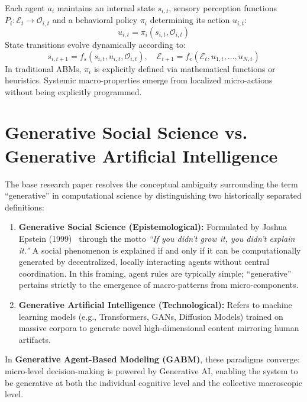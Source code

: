 \documentclass[12pt,a4paper]{report}
\begin{document}
Each agent $a_i$ maintains an internal state $s_{i,t}$, sensory perception functions $P_i: \mathcal{E}_t \to \mathcal{O}_{i,t}$ and a behavioral policy $\pi_i$ determining its action $u_{i,t}$:
\begin{equation}
u_{i,t} = \pi_i(s_{i,t}, \mathcal{O}_{i,t})
\end{equation}
State transitions evolve dynamically according to:
\begin{equation}
s_{i,t+1} = f_s(s_{i,t}, u_{i,t}, \mathcal{O}_{i,t}), \quad \mathcal{E}_{t+1} = f_e(\mathcal{E}_t, u_{1,t}, \dots, u_{N,t})
\end{equation}
In traditional ABMs, $\pi_i$ is explicitly defined via mathematical functions or heuristics. Systemic macro-properties emerge from localized micro-actions without being explicitly programmed.

\section{Generative Social Science vs. Generative Artificial Intelligence}
\label{sec:epistemology}

The base research paper resolves the conceptual ambiguity surrounding the term ``generative'' in computational science by distinguishing two historically separated definitions:

\begin{enumerate}[label=\arabic*.]
    \item \textbf{Generative Social Science (Epistemological):} Formulated by Joshua Epstein (1999)~\cite{epstein1999generative} through the motto \textit{``If you didn't grow it, you didn't explain it.''} A social phenomenon is explained if and only if it can be computationally generated by decentralized, locally interacting agents without central coordination. In this framing, agent rules are typically simple; ``generative'' pertains strictly to the emergence of macro-patterns from micro-components.
    \item \textbf{Generative Artificial Intelligence (Technological):} Refers to machine learning models (e.g., Transformers, GANs, Diffusion Models) trained on massive corpora to generate novel high-dimensional content mirroring human artifacts.
\end{enumerate}

In \textbf{Generative Agent-Based Modeling (GABM)}, these paradigms converge: micro-level decision-making is powered by Generative AI, enabling the system to be generative at both the individual cognitive level and the collective macroscopic level.
\end{document}
